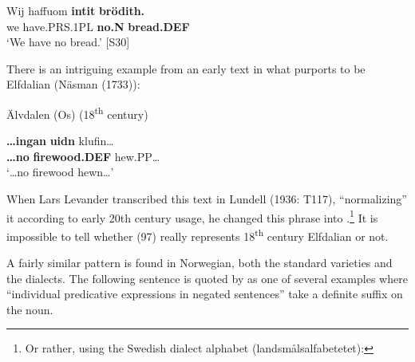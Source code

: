 

 \ea\label{}
\gll Wij  haffuom  \textbf{intit} \textbf{brödith.}\\


we  have.PRS.1PL  \textbf{no.N} \textbf{bread.DEF}\\

\glt ‘We have no bread.’ [S30]

\z

There is an intriguing example from an early text in what purports to be Elfdalian (Näsman (1733)):


\item 

\label{bkm:Ref108604709}Älvdalen (Os) (18\textsuperscript{th} century)



 \ea\label{}
\gll \textbf{…ingan} \textbf{uidn} klufin…\\


\textbf{…no} \textbf{firewood.DEF} hew.PP…\\

\glt ‘…no firewood hewn…’

\z

When Lars Levander transcribed this text in Lundell (1936: T117), “normalizing” it according to early 20th century usage, he changed this phrase into .\footnote{ Or rather, using the Swedish dialect alphabet (landsmålsalfabetetet):  }\textit{ }It is impossible to tell whether (97) really represents 18\textsuperscript{th} century Elfdalian or not. 


A fairly similar pattern is found in Norwegian, both the standard varieties and the dialects. The following sentence is quoted by \citet[302]{FaarlundEtAl1997} as one of several examples where “individual predicative expressions in negated sentences” take a definite suffix on the noun. 

